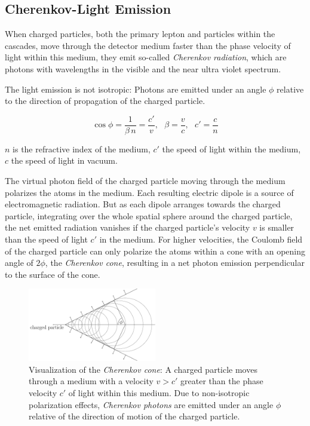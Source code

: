 \subsection{Cherenkov-Light Emission}
\label{sec:cherenkov}

When charged particles, both the primary lepton and particles within the cascades, move through the detector medium faster than the phase velocity of light within this medium, they emit so-called \textit{Cherenkov radiation}, which are photons with wavelengths in the visible and the near ultra violet spectrum. \cite{energyreco, instrumentation, skysearch}

The light emission is not isotropic: Photons are emitted under an angle $\phi$ relative to the direction of propagation of the charged particle. \cite{physiklexikon}

$$
  \cos \phi = \frac{1}{\beta\,n} = \frac{c'}{v}, \ \ \ \beta = \frac{v}{c}, \ \ \ c' = \frac{c}{n}
$$

$n$ is the refractive index of the medium, $c'$ the speed of light within the medium, $c$ the speed of light in vacuum.

The virtual photon field of the charged particle moving through the medium polarizes the atoms in the medium. Each resulting electric dipole is a source of electromagnetic radiation. But as each dipole arranges towards the charged particle, integrating over the whole spatial sphere around the charged particle, the net emitted radiation vanishes if the charged particle's velocity $v$ is smaller than the speed of light $c'$ in the medium. For higher velocities, the Coulomb field of the charged particle can only polarize the atoms within a cone with an opening angle of $2\phi$, the \textit{Cherenkov cone}, resulting in a net photon emission perpendicular to the surface of the cone. \cite{physiklexikon}

\begin{figure}[htbp]
  \centering\includegraphics[width=0.5\textwidth]{img/cherenkov}
  \caption{Visualization of the \textit{Cherenkov cone}: A charged particle moves through a medium with a velocity $v>c'$ greater than the phase velocity $c'$ of light within this medium. Due to non-isotropic polarization effects, \textit{Cherenkov photons} are emitted under an angle $\phi$ relative of the direction of motion of the charged particle.}
  \label{fig:ehai2Ahj}
\end{figure}

